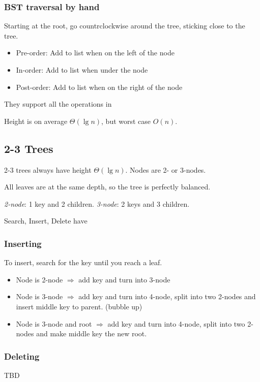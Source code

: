 \subsubsection{BST traversal by hand}
Starting at the root, go countrclockwise around the tree, sticking close to the tree.
\begin{itemize}
    \item Pre-order: Add to list when on the left of the node
    \item In-order: Add to list when under the node
    \item Post-order: Add to list when on the right of the node
\end{itemize}

They support all the operations in

Height is on average $\Theta(\lg n)$, but worst case $O(n)$.

\subsection{2-3 Trees}
2-3 trees always have height $\Theta(\lg n)$.
Nodes are 2- or 3-nodes.

All leaves are at the same depth, so the tree is perfectly balanced.

\emph{2-node}: 1 key and 2 children. \emph{3-node}: 2 keys and 3 children.

Search, Insert, Delete have 

\subsubsection{Inserting}
To insert, search for the key until you reach a leaf.
\begin{itemize}
    \item Node is 2-node $\Rightarrow$ add key and turn into 3-node
    \item Node is 3-node $\Rightarrow$ add key and turn into 4-node, split into two 2-nodes and insert middle key to parent. (bubble up)
    \item Node is 3-node and root $\Rightarrow$ add key and turn into 4-node, split into two 2-nodes and make middle key the new root.
\end{itemize}

\subsubsection{Deleting}
TBD

